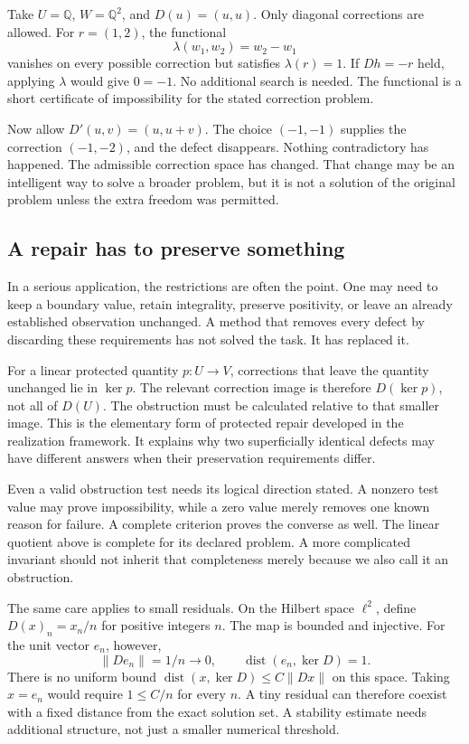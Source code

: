 Take \(U=\mathbb Q\), \(W=\mathbb Q^2\), and \(D(u)=(u,u)\). Only diagonal corrections are allowed. For \(r=(1,2)\), the functional
\[
\lambda(w_1,w_2)=w_2-w_1
\]
vanishes on every possible correction but satisfies \(\lambda(r)=1\). If \(Dh=-r\) held, applying \(\lambda\) would give \(0=-1\). No additional search is needed. The functional is a short certificate of impossibility for the stated correction problem.

Now allow \(D'(u,v)=(u,u+v)\). The choice \((-1,-1)\) supplies the correction \((-1,-2)\), and the defect disappears. Nothing contradictory has happened. The admissible correction space has changed. That change may be an intelligent way to solve a broader problem, but it is not a solution of the original problem unless the extra freedom was permitted.

\subsection{A repair has to preserve something}

In a serious application, the restrictions are often the point. One may need to keep a boundary value, retain integrality, preserve positivity, or leave an already established observation unchanged. A method that removes every defect by discarding these requirements has not solved the task. It has replaced it.

For a linear protected quantity \(p:U\to V\), corrections that leave the quantity unchanged lie in \(\ker p\). The relevant correction image is therefore \(D(\ker p)\), not all of \(D(U)\). The obstruction must be calculated relative to that smaller image. This is the elementary form of protected repair developed in the realization framework. It explains why two superficially identical defects may have different answers when their preservation requirements differ.

Even a valid obstruction test needs its logical direction stated. A nonzero test value may prove impossibility, while a zero value merely removes one known reason for failure. A complete criterion proves the converse as well. The linear quotient above is complete for its declared problem. A more complicated invariant should not inherit that completeness merely because we also call it an obstruction.

The same care applies to small residuals. On the Hilbert space \(\ell^2\), define \(D(x)_n=x_n/n\) for positive integers \(n\). The map is bounded and injective. For the unit vector \(e_n\), however,
\[
\|De_n\|=1/n\longrightarrow0,
\qquad
\operatorname{dist}(e_n,\ker D)=1.
\]
There is no uniform bound \(\operatorname{dist}(x,\ker D)\leq C\|Dx\|\) on this space. Taking \(x=e_n\) would require \(1\leq C/n\) for every \(n\). A tiny residual can therefore coexist with a fixed distance from the exact solution set. A stability estimate needs additional structure, not just a smaller numerical threshold.

